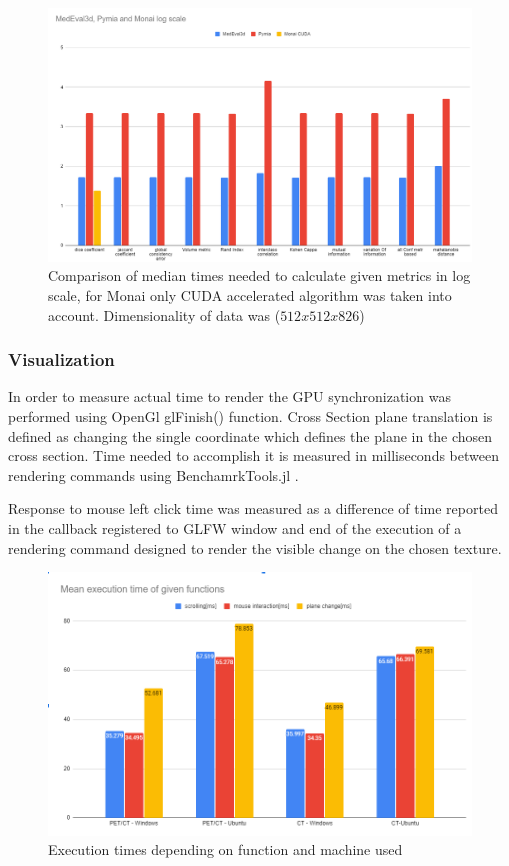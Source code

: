 \documentclass[preprint,12pt]{elsarticle}
\begin{document}
\begin{figure}[h!]
	\centering
	\includegraphics[width=\columnwidth]{bk.png}
	\caption{Comparison of median times needed to calculate given metrics in log scale, for Monai only CUDA accelerated algorithm was taken into account. Dimensionality of data was ($ 512x512x826 $)  }
	\label{fig:bk}
\end{figure}

\subsubsection{Visualization}

In order to measure actual time to  render the GPU synchronization was performed using OpenGl  glFinish() function.
Cross Section plane translation is defined as changing the single coordinate which defines the plane in the chosen cross section. Time needed to accomplish it is measured in milliseconds between rendering commands using BenchamrkTools.jl \cite{BenchmarkTools}. 

Response to mouse left click time was measured as a difference of time reported in the callback registered to GLFW window and end of the execution of a rendering command designed to render the visible change on the chosen texture.

\begin{figure}[t!]
	\centering
	\includegraphics[width=\columnwidth]{Przechwytywanie.png}
	\caption{Execution times depending on function and machine used}
	\label{fig:Przechwytywanie}
	\centering
\end{figure}
\end{document}
